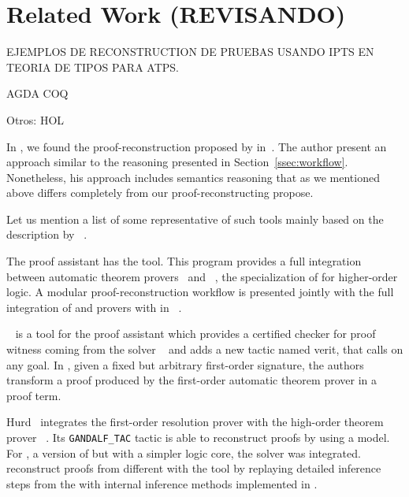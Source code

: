 \documentclass[../main.tex]{subfiles}
\begin{document}

\section{Related Work (REVISANDO)}
\label{sec:related-work}

EJEMPLOS DE RECONSTRUCTION DE PRUEBAS USANDO IPTS EN TEORIA DE TIPOS PARA
ATPS.

AGDA
COQ

Otros: HOL




In \Agda, we found the proof-reconstruction proposed by \citeauthor{Kanso2012}
in~\cite{Kanso2012,kanso2016light}. The author present an approach similar to
the reasoning presented in Section~\ref{ssec:workflow}.
Nonetheless, his approach includes semantics reasoning that as we mentioned
above differs completely from our proof-reconstructing propose.

Let us mention a list of some representative of such tools mainly based on the
description by \citeauthor{Sicard-Ramirez2016}~\cite{Sicard-Ramirez2016}.

The  proof assistant has the  tool.
This program provides a full integration between
automatic theorem provers~\cite{meng2006automation,blanchette2013extending,Fleury2014,hurlin07practical,bohme2010,blanchette2013extending} and
~\cite{nipkow2002isabelle}, the specialization of
 for higher-order logic.
A modular proof-reconstruction workflow is presented jointly with
the full integration of  and  provers with
 in \citeauthor{Een2004}~\cite{Een2004}.

~\cite{armand2011,Ekici2017} is a tool for the
 proof assistant \cite{coqteam} which provides a certified
checker for proof witness coming from the \SMT solver
~\cite{bouton2009} and adds a new tactic named verit,
that calls  on any  goal.
In \cite{Bezem2002},
given a fixed but arbitrary first-order signature, the authors
transform a proof produced by the first-order automatic theorem
prover  \cite{deNivelle2003} in a  proof
term.

Hurd~\cite{Hurd1999} integrates the first-order resolution prover
 with the high-order
theorem prover ~\cite{norrish2007hol}.
Its \verb!GANDALF_TAC! tactic is able to reconstruct  proofs
by using a  model. For , a version of
 but with a simpler logic core, the \SMT solver 
was integrated. \citeauthor{kaliszyk2013}~\cite{kaliszyk2013}
reconstruct proofs from different \ATPs with the  tool by
replaying detailed inference steps from the \ATPs with internal
inference methods implemented in .
\end{document}
